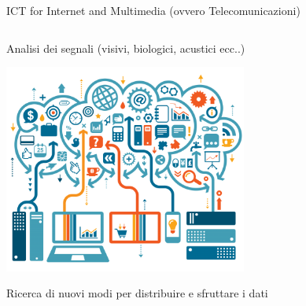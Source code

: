 \documentclass{beamer}
\begin{document}
\begin{frame}{ICT for Internet and Multimedia (ovvero Telecomunicazioni)}
\begin{columns}
\begin{column}{0.4\textwidth}
				Analisi dei segnali (visivi, biologici, acustici ecc..)

				\vspace{0.5cm}
				\includegraphics[width=0.6\textwidth]{big_data.png}

				Ricerca di nuovi modi per distribuire e sfruttare i dati
			\end{column}
		\end{columns}
	\end{frame}
\end{document}
